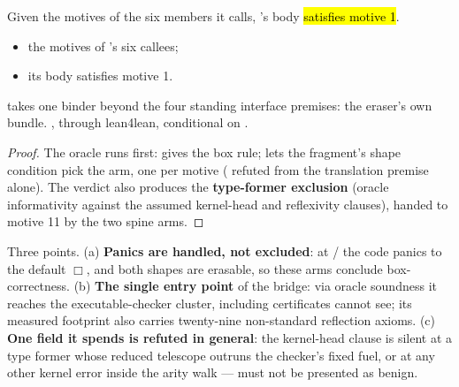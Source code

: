 \begin{theorem}
\label{thm:step_visitExpr}
\leanok
{}
 Given the motives of the six members it calls, 's body \hl{satisfies
motive 1}.
\begin{itemize}
\item {} the motives of 's six callees;
\item {} its body satisfies motive 1.
\end{itemize}
 takes one binder beyond the four standing interface premises: the eraser's own
 bundle.
 \stProved{}, \stInherited{} through lean4lean, conditional on \stAssumed{} .
\end{theorem}
\begin{proof}
\leanok
{}
 The oracle runs first:  gives the box rule;  lets the fragment's shape
condition pick the arm, one per motive ( refuted from the translation premise alone). The
 verdict also produces the \textbf{type-former exclusion} (oracle informativity against the
assumed kernel-head and reflexivity clauses), handed to motive 11 by the two spine arms.
\end{proof}

\begin{remark}
Three points.  (a) \textbf{Panics are handled, not excluded}: at /
the code panics to the default $\Box$, and both shapes are erasable, so these arms conclude
box-correctness. (b) \textbf{The single  entry point} of the bridge: via oracle soundness it
reaches the executable-checker cluster, including  certificates 
cannot see; its measured footprint also carries twenty-nine non-standard reflection axioms. (c)
\textbf{One  field it spends is refuted in general}: the kernel-head clause is silent at
a type former whose reduced telescope outruns the checker's fixed fuel, or at any other kernel error
inside the arity walk ---  must not be presented as benign.
\end{remark}

